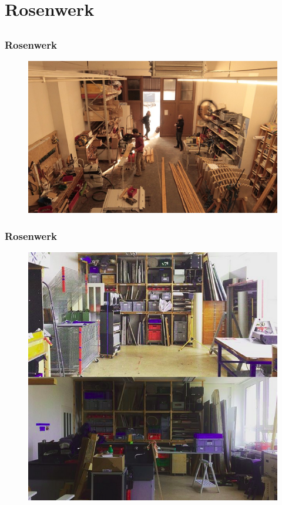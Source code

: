 \documentclass[12pt]{beamer}
\begin{document}
\section{Rosenwerk}
	\subsection{}

\begin{frame}
  \frametitle{Rosenwerk}
  \begin{figure}
    \includegraphics[height=0.7\textheight]{img/rosenwerk-holzwerkstatt-Foto_Carolin_Partsch.jpg}
  \end{figure}
\end{frame}
\begin{frame}
	\frametitle{Rosenwerk}
	\begin{figure}
	  \includegraphics[height=0.7\textheight]{img/rosenwerk-siebdruckwerkstatt.png}
	\end{figure}
  \end{frame}
\end{document}
